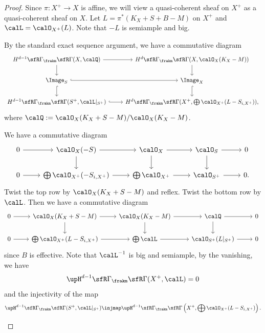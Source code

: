     \begin{proof}
        Since \(\pi: X^+ \to X\) is affine, we will view a quasi-coherent sheaf on \(X^+\) as a quasi-coherent sheaf on \(X\).
        Let \(L = \pi^*(K_X+S+B-M)\) on \(X^+\) and \(\calL = \calO_{X^+}(L)\).
        Note that \(-L\) is semiample and big.

        \begin{step}
            By the standard exact sequence argument, we have a commutative diagram
            \[ \begin{tikzcd}
                H^{d-1}\sfR\Gamma_\frakm\sfR\Gamma(X,\calQ) \arrow[r] \arrow[d] & H^d\sfR\Gamma_\frakm\sfR\Gamma(X,\calO_X(K_X-M)) \arrow[d] \\
                \Image_S \arrow[r,hook] \arrow[d,hook] & \Image_X \arrow[d,hook] \\
                H^{d-1}\sfR\Gamma_\frakm\sfR\Gamma(S^+,\calL|_{S^+}) \arrow[r,hook] & H^d\sfR\Gamma_\frakm\sfR\Gamma(X^+,\bigoplus \calO_{X^+}(L-S_{i,X^+})),
            \end{tikzcd} \]
            where \(\calQ := \calO_X(K_X + S - M)/\calO_X(K_X - M)\).
        \end{step}
        \begin{subproof}
            We have a commutative diagram
            \[ \begin{tikzcd}
                0 \arrow[r] & \calO_X(-S) \arrow[r] \arrow[d] & \calO_X \arrow[d] \arrow[r] & \calO_S \arrow[r] \arrow[d] & 0 \\
                0 \arrow[r] & \bigoplus \calO_{X^+}(-S_{i,X^+}) \arrow[r] & \bigoplus \calO_{X^+} \arrow[r] & \calO_{S^+} \arrow[r] & 0.
            \end{tikzcd} \]
            Twist the top row by \(\calO_X(K_X+S-M)\) and reflex.
            Twist the bottom row by \(\calL\).
            Then we have a commutative diagram
            \[ \begin{tikzcd}
                0 \arrow[r] & \calO_X(K_X+S-M) \arrow[r] \arrow[d] & \calO_X(K_X-M) \arrow[d] \arrow[r] & \calQ \arrow[r] \arrow[d] & 0 \\
                0 \arrow[r] & \bigoplus \calO_{X^+}(L-S_{i,X^+}) \arrow[r] & \bigoplus \calL \arrow[r] & \calO_{S^+}(L|_{S^+}) \arrow[r] & 0
            \end{tikzcd} \]
            since \(B\) is effective.
            Note that \(\calL^{-1}\) is big and semiample, by the vanishing, we have 
            \[ \upH^{d-1}\sfR\Gamma_\frakm\sfR\Gamma(X^+,\calL) = 0 \]
            and the injectivity of the map
            \[ \upH^{d-1}\sfR\Gamma_\frakm\sfR\Gamma(S^+,\calL|_{S^+}) \injmap \upH^{d-1}\sfR\Gamma_\frakm\sfR\Gamma\left(X^+,\bigoplus \calO_{X^+}(L-S_{i,X^+})\right). \]
        \end{subproof}


\end{proof}
